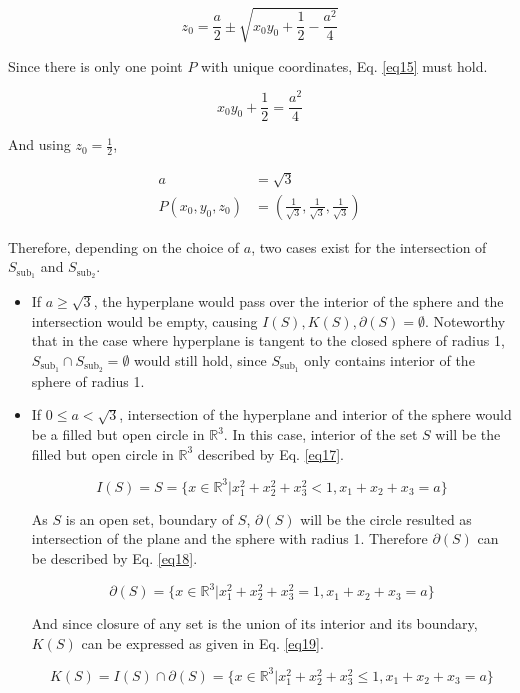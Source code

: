 \begin{equation}
z_0 = \frac{a}{2} \pm \sqrt{x_0y_0 + \frac{1}{2} - \frac{a^2}{4}}
\label{eq14}
\end{equation}

Since there is only one point $P$ with unique coordinates, Eq. \ref{eq15} must hold.

\begin{equation}
x_0y_0 + \frac{1}{2} = \frac{a^2}{4}
\label{eq15}
\end{equation}

And using $z_0 = \frac{1}{2}$,

\begin{equation}
\begin{aligned}
a &= \sqrt{3}\\
P(x_0, y_0, z_0) &= (\frac{1}{\sqrt{3}},\frac{1}{\sqrt{3}},\frac{1}{\sqrt{3}})
\end{aligned}
\label{eq16}
\end{equation}

Therefore, depending on the choice of $a$, two cases exist for the intersection of $S_{\text{sub}_1}$ and $S_{\text{sub}_2}$.
\begin{itemize}\itemsep=0pt
\item[] If $a \geq \sqrt{3}$, the hyperplane would pass over the interior of the sphere and the intersection would be empty, causing $I(S), K(S), \partial(S) = \emptyset$. Noteworthy that in the case where hyperplane is tangent to the closed sphere of radius 1, $S_{\text{sub}_1} \cap S_{\text{sub}_2} = \emptyset$ would still hold, since $S_{\text{sub}_1}$ only contains interior of the sphere of radius 1.
\item[] If $0 \leq a < \sqrt{3}$, intersection of the hyperplane and interior of the sphere would be a filled but open circle in $\mathbb{R}^3$. In this case, interior of the set $S$ will be the filled but open circle in $\mathbb{R}^3$ described by Eq. \ref{eq17}.

\begin{equation}
I(S) = S = \{x \in \mathbb{R}^3 | x_1^2 + x_2^2 + x_3^2 < 1, x_1 + x_2 + x_3 = a\}
\label{eq17}
\end{equation}

As $S$ is an open set, boundary of $S$, $\partial(S)$ will be the circle resulted as intersection of the plane and the sphere with radius 1. Therefore $\partial(S)$ can be described by Eq. \ref{eq18}.

\begin{equation}
\partial(S) = \{x \in \mathbb{R}^3 | x_1^2 + x_2^2 + x_3^2 = 1, x_1 + x_2 + x_3 = a\}
\label{eq18}
\end{equation}

And since closure of any set is the union of its interior and its boundary, $K(S)$ can be expressed as given in Eq. \ref{eq19}.

\begin{equation}
K(S) = I(S) \cap \partial(S) = \{x \in \mathbb{R}^3 | x_1^2 + x_2^2 + x_3^2 \leq 1, x_1 + x_2 + x_3 = a\}
\label{eq19}
\end{equation}

\end{itemize}
